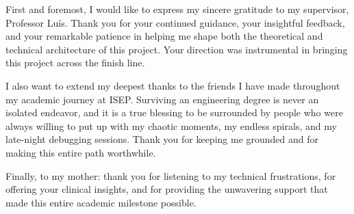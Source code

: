 
\begin{acknowledgements}

First and foremost, I would like to express my sincere gratitude to my supervisor, Professor Luís. Thank you for your continued guidance, your insightful feedback, and your remarkable patience in helping me shape both the theoretical and technical architecture of this project. Your direction was instrumental in bringing this project across the finish line.

I also want to extend my deepest thanks to the friends I have made throughout my academic journey at ISEP. Surviving an engineering degree is never an isolated endeavor, and it is a true blessing to be surrounded by people who were always willing to put up with my chaotic moments, my endless spirals, and my late-night debugging sessions. Thank you for keeping me grounded and for making this entire path worthwhile.

Finally, to my mother: thank you for listening to my technical frustrations, for offering your clinical insights, and for providing the unwavering support that made this entire academic milestone possible.

\end{acknowledgements}
